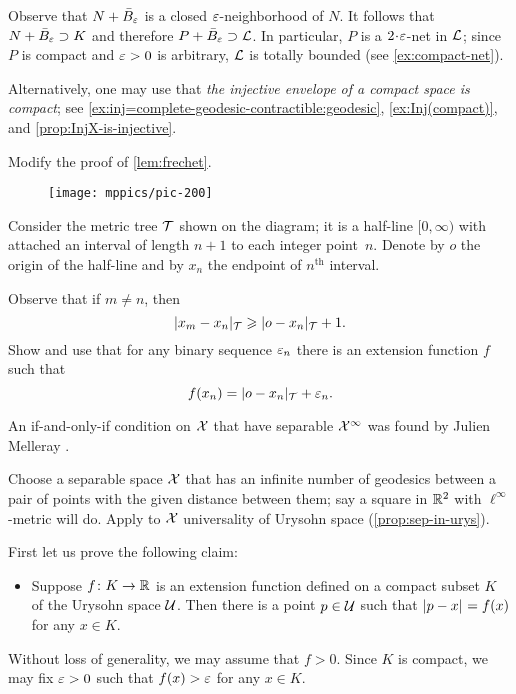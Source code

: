 Observe that $N+\bar B_\varepsilon$ is a closed $\varepsilon$-neighborhood of $N$.
It follows that $N+\bar B_\varepsilon\supset K$ and therefore $P+\bar B_\varepsilon\supset \mathcal{L}$.
In particular, $P$ is a $2\cdot\eps$-net in $\mathcal{L}$;
since $P$ is compact and $\varepsilon>0$ is arbitrary, $\mathcal{L}$ is totally bounded (see \ref{ex:compact-net}).

Alternatively, one may use that \textit{the injective envelope of a compact space is compact}; see \ref{ex:inj=complete-geodesic-contractible:geodesic}, \ref{ex:Inj(compact)}, and \ref{prop:InjX-is-injective}.

Modify the proof of \ref{lem:frechet}.

\begin{wrapfigure}{r}{30mm}
\vskip-8mm
\centering
\texttt{[image: mppics/pic-200]}
\end{wrapfigure}

Consider the metric tree $\mathcal{T}$ shown on the diagram;
it is a half-line $[0,\infty)$ with attached an interval of length $n+1$ to each integer point~$n$.
Denote by $o$ the origin of the half-line
and by $x_n$ the endpoint of $n^{\text{th}}$ interval.

Observe that if $m\ne n$, then
\[|x_m-x_n|_{\mathcal{T}}\geqslant |o-x_n|_{\mathcal{T}}+1.\]
Show and use that for any binary sequence $\varepsilon_n$ there is an extension function $f$ such that 
\[f(x_n)=|o-x_n|_{\mathcal{T}}+\varepsilon_n.\]


An if-and-only-if condition on $\mathcal{X}$ that have separable $\mathcal{X}^\infty$ was found by Julien Melleray \cite[2.8]{melleray}.

Choose a separable space $\mathcal{X}$ that has an infinite number of geodesics between a pair of points with the given distance between them;
say a square in $\mathbb{R}^2$ with $\ell^\infty$-metric will do.
Apply to $\mathcal{X}$ universality of Urysohn space (\ref{prop:sep-in-urys}).

First let us prove the following claim:

\begin{itemize}
\item 
Suppose $f\colon K\to\mathbb{R}$ is an extension function defined on a compact subset $K$ of the Urysohn space $\mathcal{U}$.
Then there is a point $p\in \mathcal{U}$ such that 
$\dist{p}{x}{}=f(x)$ for any $x\in K$.
\end{itemize}

Without loss of generality, we may assume that $f>0$.
Since $K$ is compact, we may fix $\varepsilon>0$ such that $f(x)>\varepsilon$ for any $x\in K$.


